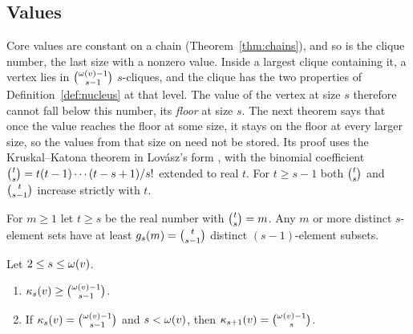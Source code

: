 \subsection{Values}\label{sec:values}
Core values are constant on a chain (Theorem~\ref{thm:chains}), and so is the clique number, the last size with a nonzero value.
%
Inside a largest clique containing it, a vertex lies in $\binom{\omega(v)-1}{s-1}$ $s$-cliques, and the clique has the two properties of Definition~\ref{def:nucleus} at that level.
%
The value of the vertex at size $s$ therefore cannot fall below this number, its \textit{floor} at size $s$.
%
The next theorem says that once the value reaches the floor at some size, it stays on the floor at every larger size, so the values from that size on need not be stored.
%
Its proof uses the Kruskal--Katona theorem in Lov\'asz's form \cite{kruskal1963,katona1968,lovasz1979}, with the binomial coefficient $\binom{t}{s}=t(t-1)\cdots(t-s+1)/s!$ extended to real $t$.
%
For $t\ge s-1$ both $\binom{t}{s}$ and $\binom{t}{s-1}$ increase strictly with $t$.
\begin{lemma}\label{lem:kk}
For $m\ge1$ let $t\ge s$ be the real number with $\binom{t}{s}=m$.
%
Any $m$ or more distinct $s$-element sets have at least $g_s(m)=\binom{t}{s-1}$ distinct $(s-1)$-element subsets.
\end{lemma}
\begin{theorem}\label{thm:tail}
Let $2\le s\le\omega(v)$.
\begin{enumerate}[label=(\alph*),leftmargin=*,nosep]
\item $\kappa_{s}(v)\ge\binom{\omega(v)-1}{s-1}$.
\item If $\kappa_{s}(v)=\binom{\omega(v)-1}{s-1}$ and $s<\omega(v)$, then $\kappa_{s+1}(v)=\binom{\omega(v)-1}{s}$.
\end{enumerate}
\end{theorem}
